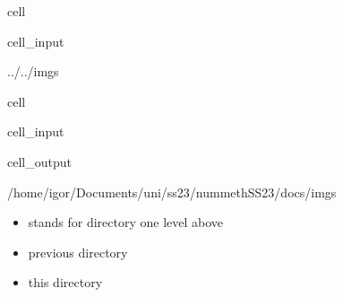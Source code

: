 \documentclass[a4paper,10pt,english]{jupyterBook}
\begin{document}
\begin{sphinxuseclass}{cell}\begin{sphinxVerbatimInput}

\begin{sphinxuseclass}{cell_input}
\begin{sphinxVerbatim}[commandchars=\\\{\}]
../../imgs
\end{sphinxVerbatim}

\end{sphinxuseclass}\end{sphinxVerbatimInput}

\end{sphinxuseclass}
\begin{sphinxuseclass}{cell}\begin{sphinxVerbatimInput}

\begin{sphinxuseclass}{cell_input}
\begin{sphinxVerbatim}[commandchars=\\\{\}]
\end{sphinxVerbatim}

\end{sphinxuseclass}\end{sphinxVerbatimInput}
\begin{sphinxVerbatimOutput}

\begin{sphinxuseclass}{cell_output}
\begin{sphinxVerbatim}[commandchars=\\\{\}]
/home/igor/Documents/uni/ss23/nummethSS23/docs/imgs
\end{sphinxVerbatim}

\end{sphinxuseclass}\end{sphinxVerbatimOutput}

\end{sphinxuseclass}\begin{itemize}
\item {} 
\sphinxAtStartPar
{} stands for directory one level above

\item {} 
\sphinxAtStartPar
\sphinxcode{\sphinxupquote{\sphinxhyphen{}}} previous directory

\item {} 
\sphinxAtStartPar
{} this directory

\end{itemize}
\end{document}
